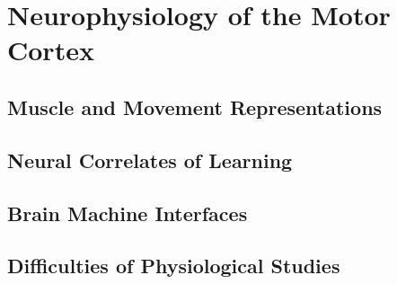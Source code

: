 \section{Neurophysiology of the Motor Cortex}

\subsection{Muscle and Movement Representations}

\subsection{Neural Correlates of Learning}

\subsection{Brain Machine Interfaces}

\subsection{Difficulties of Physiological Studies}